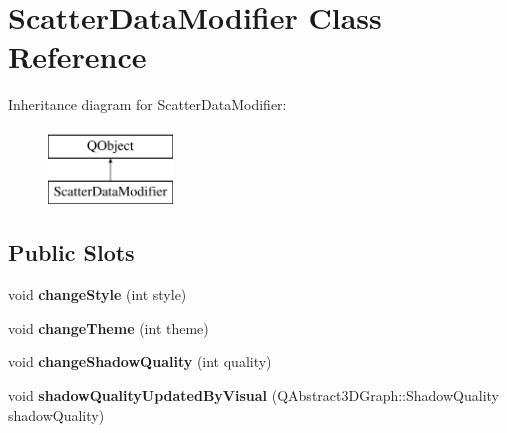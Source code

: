 \hypertarget{class_scatter_data_modifier}{}\section{Scatter\+Data\+Modifier Class Reference}
\label{class_scatter_data_modifier}
Inheritance diagram for Scatter\+Data\+Modifier\+:\begin{figure}[H]
\begin{center}
\leavevmode
\includegraphics[height=2.000000cm]{class_scatter_data_modifier}
\end{center}
\end{figure}
\subsection*{Public Slots}
\begin{DoxyCompactItemize}
\item 
void {\bfseries change\+Style} (int style)\hypertarget{class_scatter_data_modifier_aa611530212bcdbecdd178a62fc4fc814}{}\label{class_scatter_data_modifier_aa611530212bcdbecdd178a62fc4fc814}

\item 
void {\bfseries change\+Theme} (int theme)\hypertarget{class_scatter_data_modifier_af99b708936c5f34af1ccb6c71b82642c}{}\label{class_scatter_data_modifier_af99b708936c5f34af1ccb6c71b82642c}

\item 
void {\bfseries change\+Shadow\+Quality} (int quality)\hypertarget{class_scatter_data_modifier_a2e160680fbbcea470a23f4c68e1d3207}{}\label{class_scatter_data_modifier_a2e160680fbbcea470a23f4c68e1d3207}

\item 
void {\bfseries shadow\+Quality\+Updated\+By\+Visual} (Q\+Abstract3\+D\+Graph\+::\+Shadow\+Quality shadow\+Quality)\hypertarget{class_scatter_data_modifier_a04be737d91afae1b3ae247b63a5de3a4}{}\label{class_scatter_data_modifier_a04be737d91afae1b3ae247b63a5de3a4}

\end{DoxyCompactItemize}

